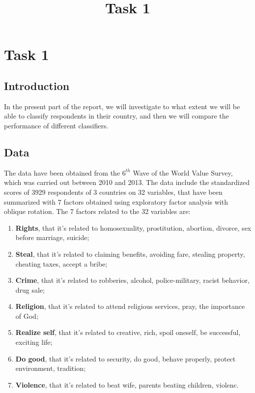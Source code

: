 \documentclass[
  11pt,
]{article}
\title{Task 1}
\author{}
\date{\vspace{-2.5em}}
\providecommand{\tightlist}{%
  \setlength{\itemsep}{0pt}\setlength{\parskip}{0pt}}
\begin{document}
\maketitle

{
\setcounter{tocdepth}{2}
\tableofcontents
}
\hypertarget{task-1}{%
\section{Task 1}\label{task-1}}

\hypertarget{introduction}{%
\subsection{Introduction}\label{introduction}}

In the present part of the report, we will investigate to what extent we will be able to classify respondents in their country, and then we will compare the performance of different classifiers.

\hypertarget{data}{%
\subsection{Data}\label{data}}

The data have been obtained from the \(6^{th}\) Wave of the World Value Survey, which was carried out between 2010 and 2013. The data include the standardized scores of 3929 respondents of 3 countries on 32 variables, that have been summarized with 7 factors obtained using exploratory factor analysis with oblique rotation.
The 7 factors related to the 32 variables are:

\begin{enumerate}
\def\labelenumi{\arabic{enumi}.}
\tightlist
\item
  \textbf{Rights}, that it's related to homosexuality, prostitution, abortion, divorce, sex before marriage, suicide;
\item
  \textbf{Steal}, that it's related to claiming benefits, avoiding fare, stealing property, cheating taxes, accept a bribe;
\item
  \textbf{Crime}, that it's related to robberies, alcohol, police-military, racist behavior, drug sale;
\item
  \textbf{Religion}, that it's related to attend religious services, pray, the importance of God;
\item
  \textbf{Realize self}, that it's related to creative, rich, spoil oneself, be successful, exciting life;
\item
  \textbf{Do good}, that it's related to security, do good, behave properly, protect environment, tradition;
\item
  \textbf{Violence}, that it's related to beat wife, parents beating children, violenc.
\end{enumerate}
\end{document}
